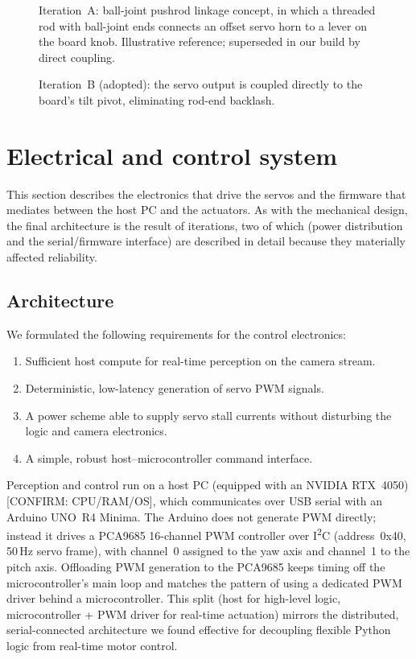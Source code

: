 \begin{figure}[t]
\centering
\caption{Iteration~A: ball-joint pushrod linkage concept, in which a threaded
rod with ball-joint ends connects an offset servo horn to a lever on the board
knob. Illustrative reference; superseded in our build by direct coupling.}
\label{fig:tie-rod}
\end{figure}

\begin{figure}[t]
\centering
\caption{Iteration~B (adopted): the servo output is coupled directly to the
board's tilt pivot, eliminating rod-end backlash.}
\label{fig:direct-coupling}
\end{figure}

\section{Electrical and control system}
\label{sec:elec}

This section describes the electronics that drive the servos and the firmware
that mediates between the host PC and the actuators. As with the mechanical
design, the final architecture is the result of iterations, two of which
(power distribution and the serial/firmware interface) are described in detail
because they materially affected reliability.

\subsection{Architecture}
\label{sec:elec-arch}

We formulated the following requirements for the control electronics:

\begin{enumerate}
  \item Sufficient host compute for real-time perception on the camera stream.
  \item Deterministic, low-latency generation of servo PWM signals.
  \item A power scheme able to supply servo stall currents without disturbing
    the logic and camera electronics.
  \item A simple, robust host--microcontroller command interface.
\end{enumerate}

Perception and control run on a host PC (equipped with an NVIDIA RTX~4050)
[CONFIRM: CPU/RAM/OS], which communicates over USB serial with an Arduino
UNO~R4 Minima. The Arduino does not generate PWM directly; instead it drives a
PCA9685 16-channel PWM controller over I\textsuperscript{2}C
(address~0x40, 50\,Hz servo frame), with channel~0 assigned to the yaw axis and
channel~1 to the pitch axis. Offloading PWM generation to the PCA9685 keeps
timing off the microcontroller's main loop and matches the pattern of using a
dedicated PWM driver behind a microcontroller. This split (host for
high-level logic, microcontroller + PWM driver for real-time actuation)
mirrors the distributed, serial-connected architecture we found effective for
decoupling flexible Python logic from real-time motor control.

